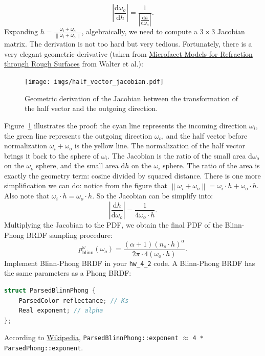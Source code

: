 \begin{equation}
\left|\frac{\mathrm{d}\omega_o}{\mathrm{d}h}\right| = \frac{1}{\left|\frac{\mathrm{d}h}{\mathrm{d}\omega_o}\right|}.
\end{equation}
Expanding $h = \frac{\omega_i + \omega_o}{\left\|\omega_i + \omega_o\right\|}$, algebraically, we need to compute a $3 \times 3$ Jacobian matrix. The derivation is not too hard but very tedious. Fortunately, there is a very elegant geometric derivative (taken from \href{http://www.graphics.cornell.edu/~bjw/microfacetbsdf.pdf}{Microfacet Models for Refraction through Rough Surfaces} from Walter et al.):
\begin{figure}[ht]
    \centering
    \texttt{[image: imgs/half\_vector\_jacobian.pdf]}
    \caption{Geometric derivation of the Jacobian between the transformation of the half vector and the outgoing direction.}
    \label{fig:half_vector_jacobian}
\end{figure}
Figure~\ref{fig:half_vector_jacobian} illustrates the proof: the cyan line represents the incoming direction $\omega_i$, the green line represents the outgoing direction $\omega_o$, and the half vector before normalization $\omega_i + \omega_o$ is the yellow line. The normalization of the half vector brings it back to the sphere of $\omega_i$. The Jacobian is the ratio of the small area $\mathrm{d}\omega_o$ on the $\omega_o$ sphere, and the small area $\mathrm{d}h$ on the $\omega_i$ sphere. The ratio of the area is exactly the geometry term: cosine divided by squared distance.
There is one more simplification we can do: notice from the figure that $\left\|\omega_i + \omega_o\right\| = \omega_i \cdot h + \omega_o \cdot h$. Also note that $\omega_i \cdot h = \omega_o \cdot h$. So the Jacobian can be simplify into:
\begin{equation}
\left|\frac{\mathrm{d}h}{\mathrm{d}\omega_o}\right| = \frac{1}{4 \omega_o \cdot h}.
\end{equation}
Multiplying the Jacobian to the PDF, we obtain the final PDF of the Blinn-Phong BRDF sampling procedure:
\begin{equation}
p_{\text{blinn}}^{\omega}(\omega_o) = \frac{\left(\alpha + 1\right) \left(n_s \cdot h\right)^{\alpha}}{2\pi \cdot 4 \left(\omega_o \cdot h\right)}.
\end{equation}
Implement Blinn-Phong BRDF in your \lstinline{hw_4_2} code. A Blinn-Phong BRDF has the same parameters as a Phong BRDF:
\begin{lstlisting}[language=C++]
struct ParsedBlinnPhong {
    ParsedColor reflectance; // Ks
    Real exponent; // alpha
};
\end{lstlisting}
According to \href{https://en.wikipedia.org/wiki/Blinn%E2%80%93Phong_reflection_model}{Wikipedia}, \lstinline{ParsedBlinnPhong::exponent} $\approx$ \lstinline{4 * ParsedPhong::exponent}.

